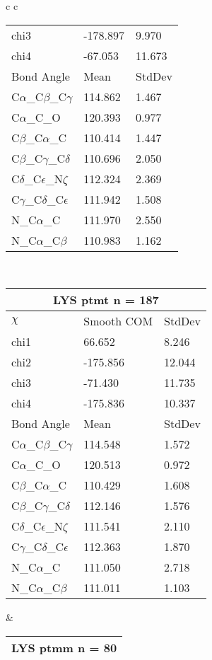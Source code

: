 \begin{longtable}{ c c }
\begin{tabular}{ l l l }
  chi3 & -178.897 & 9.970 \\ 
  chi4 & -67.053 & 11.673 \\ \midrule
  Bond Angle   & Mean     & StdDev \\ \midrule
  C$\alpha$\_C$\beta$\_C$\gamma$ & 114.862 & 1.467\\
  C$\alpha$\_C\_O & 120.393 & 0.977\\
  C$\beta$\_C$\alpha$\_C & 110.414 & 1.447\\
  C$\beta$\_C$\gamma$\_C$\delta$ & 110.696 & 2.050\\
  C$\delta$\_C$\epsilon$\_N$\zeta$ & 112.324 & 2.369\\
  C$\gamma$\_C$\delta$\_C$\epsilon$ & 111.942 & 1.508\\
  N\_C$\alpha$\_C & 111.970 & 2.550\\
  N\_C$\alpha$\_C$\beta$ & 110.983 & 1.162\\
  \bottomrule
  \end{tabular}
  \\
  \begin{tabular}{ l l l }
  \toprule
  \multicolumn{3}{c}{LYS \textbf{ptmt} n = 187} \\ \toprule
  $\chi$       & Smooth COM & StdDev \\ \midrule
  chi1 & 66.652 & 8.246 \\ 
  chi2 & -175.856 & 12.044 \\ 
  chi3 & -71.430 & 11.735 \\ 
  chi4 & -175.836 & 10.337 \\ \midrule
  Bond Angle   & Mean     & StdDev \\ \midrule
  C$\alpha$\_C$\beta$\_C$\gamma$ & 114.548 & 1.572\\
  C$\alpha$\_C\_O & 120.513 & 0.972\\
  C$\beta$\_C$\alpha$\_C & 110.429 & 1.608\\
  C$\beta$\_C$\gamma$\_C$\delta$ & 112.146 & 1.576\\
  C$\delta$\_C$\epsilon$\_N$\zeta$ & 111.541 & 2.110\\
  C$\gamma$\_C$\delta$\_C$\epsilon$ & 112.363 & 1.870\\
  N\_C$\alpha$\_C & 111.050 & 2.718\\
  N\_C$\alpha$\_C$\beta$ & 111.011 & 1.103\\
  \bottomrule
  \end{tabular}
  &
  \begin{tabular}{ l l l }
  \toprule
  \multicolumn{3}{c}{LYS \textbf{ptmm} n = 80} \\ \toprule

\end{tabular}
\end{longtable}
